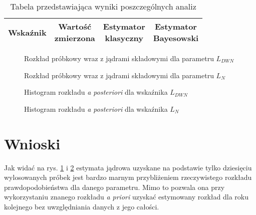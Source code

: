 \documentclass[polish,a4paper,11pt]{mwart}
\let\Oldsection\section
\renewcommand{\section}{\FloatBarrier\Oldsection}
\begin{document}
\begin{table}[!tbh]
  \centering
  \caption{Tabela przedstawiająca wyniki poszczególnych analiz}
  \begin{tabular}{|c|c|c|c|}
    \hline
    Wskaźnik & \makecell{Wartość \\ zmierzona} & \makecell{Estymator \\
    klasyczny} & \makecell{Estymator \\ Bayesowski} \\\hline
    
  \end{tabular}
  \label{tab:wyniki}
\end{table}

\begin{figure}[!tbh]
  \centering
  
  \caption{Rozkład próbkowy wraz z jądrami składowymi dla parametru $L_{DWN}$}
  \label{plot:kernel_ldwn}
\end{figure}

\begin{figure}[!tbh]
  \centering
  
  \caption{Rozkład próbkowy wraz z jądrami składowymi dla parametru $L_{N}$}
  \label{plot:kernel_ln}
\end{figure}

\begin{figure}[!tbh]
  \centering
  
  \caption{Histogram rozkładu \textit{a posteriori} dla wskaźnika $L_{DWN}$}
  \label{plot:hist_ldwn}
\end{figure}

\begin{figure}[!tbh]
  \centering
  
  \caption{Histogram rozkładu \textit{a posteriori} dla wskaźnika $L_{N}$}
  \label{plot:hist_ln}
\end{figure}

\section{Wnioski}

Jak widać na rys. \ref{plot:kernel_ldwn} i \ref{plot:kernel_ln} estymata jądrowa
uzyskane na podstawie tylko dziesięciu wylosowanych próbek jest bardzo marnym
przybliżeniem rzeczywistego rozkładu prawdopodobieństwa dla danego parametru.
Mimo to pozwala ona przy wykorzystaniu znanego rozkładu \textit{a priori}
uzyskać estymowany rozkład dla roku kolejnego bez uwzględniania danych z jego
całości.
\end{document}
